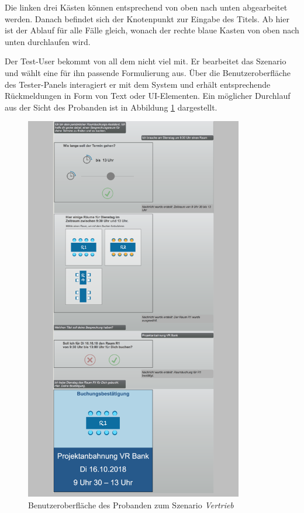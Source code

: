 Die linken drei Kästen können entsprechend von oben nach unten abgearbeitet werden. Danach befindet sich der Knotenpunkt zur Eingabe des Titels. Ab hier ist der Ablauf für alle Fälle gleich, wonach der rechte blaue Kasten von oben nach unten durchlaufen wird. 

Der Test-User bekommt von all dem nicht viel mit. Er bearbeitet das Szenario und wählt eine für ihn passende Formulierung aus. Über die Benutzeroberfläche des Tester-Panels interagiert er mit dem System und erhält entsprechende Rückmeldungen in Form von Text oder \ac{UI}-Elementen. Ein möglicher Durchlauf aus der Sicht des Probanden ist in Abbildung \ref{fig:test-user-screen-vertrieb} dargestellt.
\newline

\begin{figure}[H]
    \centering
    \includegraphics[width=0.85\textwidth]{bilder/WorkflowTesterPanel.png}
    \caption{Benutzeroberfläche des Probanden zum Szenario \textit{Vertrieb}}
    \label{fig:test-user-screen-vertrieb}
\end{figure}

